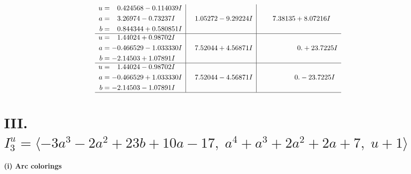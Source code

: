 \documentclass[1p]{elsarticle_modified}
\theoremstyle{definition}
\begin{document}
$$\begin{array}{c|c|c}
\begin{aligned}
u &= \phantom{-}0.424568 - 0.114039 I \\
a &= \phantom{-}3.26974 - 0.73237 I \\
b &= \phantom{-}0.844344 + 0.580851 I\end{aligned}
 & \phantom{-}1.05272 - 9.29224 I & \phantom{-}7.38135 + 8.07216 I \\ \hline\begin{aligned}
u &= \phantom{-}1.44024 + 0.98702 I \\
a &= -0.466529 - 1.033330 I \\
b &= -2.14503 + 1.07891 I\end{aligned}
 & \phantom{-}7.52044 + 4.56871 I & \phantom{-0.000000 -}0. + 23.7225 I \\ \hline\begin{aligned}
u &= \phantom{-}1.44024 - 0.98702 I \\
a &= -0.466529 + 1.033330 I \\
b &= -2.14503 - 1.07891 I\end{aligned}
 & \phantom{-}7.52044 - 4.56871 I & \phantom{-0.000000 } 0. - 23.7225 I\\
 \hline 
 \end{array}$$\newpage\newpage\renewcommand{\arraystretch}{1}
\centering \section*{III. $I^u_{3}= \langle -3 a^3-2 a^2+23 b+10 a-17,\;a^4+a^3+2 a^2+2 a+7,\;u+1 \rangle$}
\flushleft \textbf{(i) Arc colorings}\\
\end{document}
